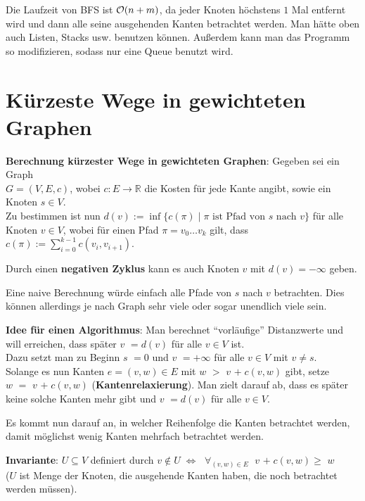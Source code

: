 Die Laufzeit von BFS ist $\mathcal{O}(n + m)$, da jeder Knoten höchstens $1$ Mal
entfernt wird und dann alle seine ausgehenden Kanten betrachtet werden.
Man hätte oben auch Listen, Stacks usw. benutzen können.
Außerdem kann man das Programm so modifizieren, sodass nur eine
Queue benutzt wird.

\pagebreak

\section{%
    Kürzeste Wege in gewichteten Graphen%
}

\textbf{Berechnung kürzester Wege in gewichteten Graphen}:
Gegeben sei ein Graph \\
$G = (V, E, c)$, wobei $c: E \rightarrow \mathbb{R}$
die Kosten für jede Kante angibt, sowie ein Knoten $s \in V$. \\
Zu bestimmen ist nun
$d(v) := \inf\{c(\pi) \;|\; \pi \text{ ist Pfad von } s \text{ nach } v\}$
für alle Knoten $v \in V$, wobei für einen Pfad
$\pi = v_0 \dotsc v_k$ gilt, dass
$c(\pi) := \sum_{i=0}^{k-1} c(v_i, v_{i+1})$.

Durch einen \textbf{negativen Zyklus} kann es auch Knoten $v$ mit
$d(v) = -\infty$ geben.

Eine naive Berechnung würde einfach alle Pfade von $s$ nach $v$ betrachten.
Dies können allerdings je nach Graph sehr viele oder sogar unendlich viele
sein.

\linie

\textbf{Idee für einen Algorithmus}:
Man berechnet "`vorläufige"' Distanzwerte  und will erreichen,
dass später \code{dist[}$v$\code{]} $= d(v)$ für alle $v \in V$ ist. \\
Dazu setzt man zu Beginn \code{dist[}$s$\code{]} $= 0$ und
\code{dist[}$v$\code{]} $= +\infty$ für alle $v \in V$ mit $v \not= s$. \\
Solange es nun Kanten $e = (v, w) \in E$ mit
\code{dist[}$w$\code{]} $>$ \code{dist[}$v$\code{]} $+\; c(v,w)$ gibt, setze \\
\code{dist[}$w$\code{]} $=$ \code{dist[}$v$\code{]} $+\; c(v,w)$
(\textbf{Kantenrelaxierung}).
Man zielt darauf ab, dass es später keine solche Kanten mehr gibt
und \code{dist[}$v$\code{]} $= d(v)$ für alle $v \in V$.

Es kommt nun darauf an, in welcher Reihenfolge die Kanten betrachtet werden,
damit möglichst wenig Kanten mehrfach betrachtet werden.

\textbf{Invariante}:
$U \subseteq V$ definiert durch $v \notin U \;\Leftrightarrow\;$
$\forall_{(v,w) \in E}\;$
\code{dist[}$v$\code{]} $+\; c(v,w) \ge$ \code{dist[}$w$\code{]} \\
($U$ ist Menge der Knoten, die ausgehende Kanten haben, die noch
betrachtet werden müssen).

